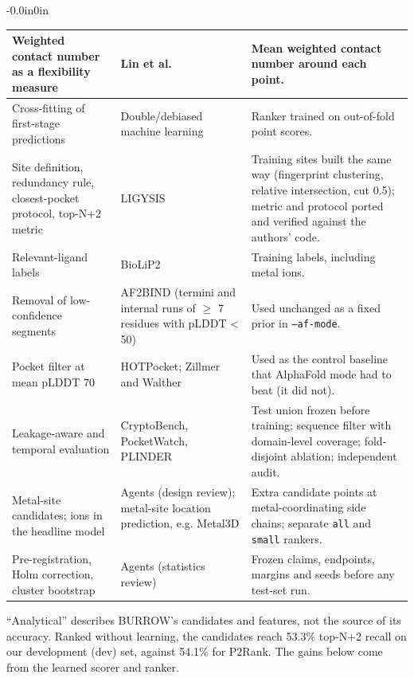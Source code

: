 \documentclass[10pt,letterpaper]{article}
\begin{document}
\begin{table}[!ht]
\begin{adjustwidth}{-0.0in}{0in}
{\begin{tabular}{p{3.1cm}p{5.3cm}p{6.3cm}}
Weighted contact number as a flexibility measure & Lin et al. ~\cite{lin2008} & Mean weighted contact number around each point. \\ \hline
Cross-fitting of first-stage predictions & Double/debiased machine learning ~\cite{chernozhukov2018} & Ranker trained on out-of-fold point scores. \\ \hline
Site definition, redundancy rule, closest-pocket protocol, top-N+2 metric & LIGYSIS ~\cite{utges2024} & Training sites built the same way (fingerprint clustering, relative intersection, cut 0.5); metric and protocol ported and verified against the authors' code. \\ \hline
Relevant-ligand labels & BioLiP2 ~\cite{zhang2024} & Training labels, including metal ions. \\ \hline
Removal of low-confidence segments & AF2BIND (termini and internal runs of $\ge$ 7 residues with pLDDT \textless{} 50) ~\cite{gazizov2026} & Used unchanged as a fixed prior in \texttt{--af-mode}. \\ \hline
Pocket filter at mean pLDDT 70 & HOTPocket; Zillmer and Walther ~\cite{carpenter2025,zillmer2025} & Used as the control baseline that AlphaFold mode had to beat (it did not). \\ \hline
Leakage-aware and temporal evaluation & CryptoBench, PocketWatch, PLINDER ~\cite{skrhak2025,portnoi2026,durairaj2024} & Test union frozen before training; sequence filter with domain-level coverage; fold-disjoint ablation; independent audit. \\ \hline
Metal-site candidates; ions in the headline model & Agents (design review); metal-site location prediction, e.g. Metal3D ~\cite{durr2023} & Extra candidate points at metal-coordinating side chains; separate \texttt{all} and \texttt{small} rankers. \\ \hline
Pre-registration, Holm correction, cluster bootstrap & Agents (statistics review) ~\cite{holm1979} & Frozen claims, endpoints, margins and seeds before any test-set run. \\ \hline
\end{tabular}}
\end{adjustwidth}
\end{table}

``Analytical'' describes BURROW's candidates and features, not the source of its accuracy. Ranked without learning, the candidates reach 53.3\% top-N+2 recall on our development (dev) set, against 54.1\% for P2Rank. The gains below come from the learned scorer and ranker.
\end{document}
